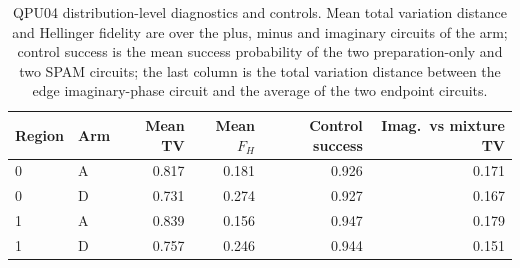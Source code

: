 \begin{table}[htbp]\centering\small
\caption{QPU04 distribution-level diagnostics and controls. Mean total variation distance and Hellinger fidelity are over the plus, minus and imaginary circuits of the arm; control success is the mean success probability of the two preparation-only and two SPAM circuits; the last column is the total variation distance between the edge imaginary-phase circuit and the average of the two endpoint circuits.}\label{tab:q4-controls}
\begin{tabular}{llrrrr}\toprule Region & Arm & Mean TV & Mean $F_H$ & Control success & Imag.\ vs mixture TV\\\midrule
0 & A & 0.817 & 0.181 & 0.926 & 0.171\\
0 & D & 0.731 & 0.274 & 0.927 & 0.167\\
1 & A & 0.839 & 0.156 & 0.947 & 0.179\\
1 & D & 0.757 & 0.246 & 0.944 & 0.151\\
\bottomrule\end{tabular}\end{table}

